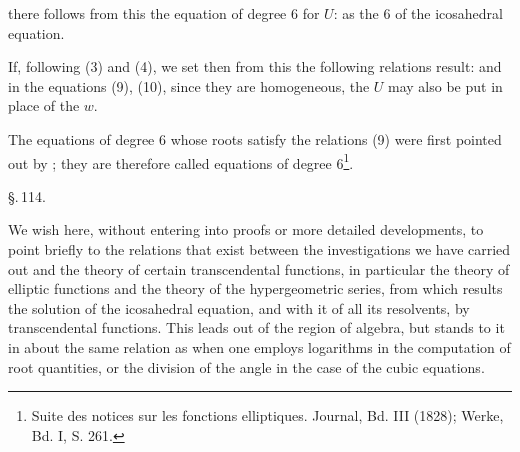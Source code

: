 there follows from this the equation of degree 6 for $U$:
as the  6 of the icosahedral equation.

If, following (3) and (4), we set
then from this the following relations result:
and in the equations (9), (10), since they are homogeneous, the $U$ may also be put in place of the $w$.

The equations of degree 6 whose roots satisfy the relations (9) were first pointed out by ; they are therefore called  equations of degree 6\footnote{Suite des notices sur les fonctions elliptiques.  Journal, Bd. III (1828); Werke, Bd. I, S. 261.}.

\begin{center}
\S.\,114.\\[4pt]
\end{center}

We wish here, without entering into proofs or more detailed developments, to point briefly to the relations that exist between the investigations we have carried out and the theory of certain transcendental functions, in particular the theory of elliptic functions and the theory of the hypergeometric series, from which results the solution of the icosahedral equation, and with it of all its resolvents, by transcendental functions. This leads out of the region of algebra, but stands to it in about the same relation as when one employs logarithms in the computation of root quantities, or the division of the angle in the case of the cubic equations.
